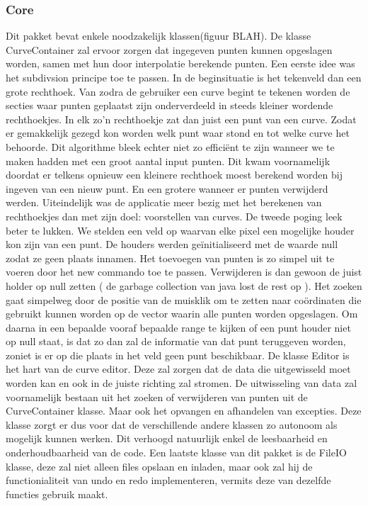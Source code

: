 \documentclass[a4paper,11pt,oneside, titlepage]{article}
\begin{document}
\subsubsection{Core}
Dit pakket bevat enkele noodzakelijk klassen(figuur BLAH).\newline \newline
De klasse CurveContainer zal ervoor zorgen dat ingegeven punten kunnen opgeslagen worden, samen
met hun door interpolatie berekende punten. \newline \newline
Een eerste idee was het subdivsion principe toe te passen. In de beginsituatie is het tekenveld
dan een grote rechthoek. Van zodra de gebruiker een curve begint te tekenen worden de secties
waar punten geplaatst zijn onderverdeeld in steeds kleiner wordende rechthoekjes. In elk zo'n
rechthoekje zat dan juist een punt van een curve. Zodat er gemakkelijk gezegd kon worden
welk punt waar stond en tot welke curve het behoorde.\newline
Dit algorithme bleek echter niet zo effici\"ent te zijn wanneer we te maken hadden met een groot
aantal input punten. Dit kwam voornamelijk doordat er telkens opnieuw een kleinere rechthoek
moest berekend worden bij ingeven van een nieuw punt. En een grotere wanneer er punten verwijderd
werden. Uiteindelijk was de applicatie meer bezig met het berekenen van rechthoekjes dan met zijn
doel: voorstellen van curves.\newline \newline
De tweede poging leek beter te lukken. We stelden een veld op waarvan elke pixel een mogelijke
houder kon zijn van een punt. De houders werden ge\"initialiseerd met de waarde null zodat ze 
geen
plaats innamen. Het toevoegen van punten is zo simpel uit te voeren door het new commando toe
te passen. Verwijderen is dan gewoon de juist holder op null zetten ( de garbage collection van
java lost de rest op ). Het zoeken gaat simpelweg door de positie van de muisklik om te 
zetten naar co\"ordinaten die gebruikt kunnen worden op de vector waarin alle punten worden 
opgeslagen. Om daarna in een bepaalde vooraf bepaalde range te kijken of een punt houder niet
op null staat, is dat zo dan zal de informatie van dat punt teruggeven worden, zoniet is er op
die plaats in het veld geen punt beschikbaar.\newline \newline
De klasse Editor is het hart van de curve editor. Deze zal zorgen dat de data die uitgewisseld
moet worden kan en ook in de juiste richting zal stromen. De uitwisseling van data zal 
voornamelijk bestaan uit het zoeken of verwijderen van punten uit de CurveContainer klasse.
Maar ook het opvangen en afhandelen van excepties. Deze klasse zorgt er dus voor dat de 
verschillende andere klassen zo autonoom als mogelijk kunnen werken. Dit verhoogd natuurlijk
enkel de leesbaarheid en onderhoudbaarheid van de code.\newline \newline
Een laatste klasse van dit pakket is de FileIO klasse, deze zal niet alleen files opslaan en
inladen, maar ook zal hij de functionialiteit van undo en redo implementeren, vermits deze van
dezelfde functies gebruik maakt.
\end{document}
